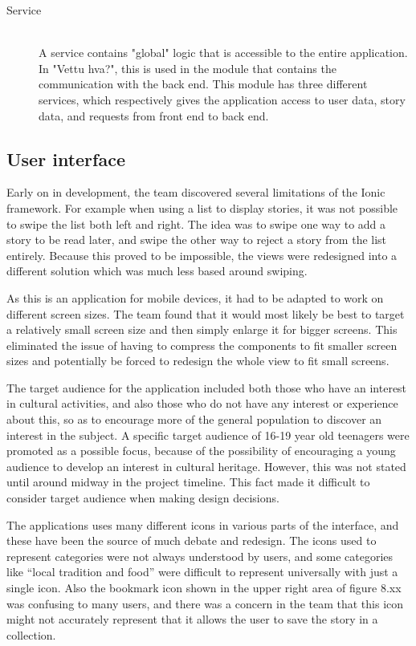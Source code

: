 \begin{description}
	\item[Service] \hfill \\ 
	A service contains "global" logic that is accessible to the entire application. In "Vettu hva?", this is used in the module that contains the communication with the back end. This module has three different services, which respectively gives the application access to user data, story data, and requests from front end to back end.
\end{description}

\subsection{User interface}

Early on in development, the team discovered several limitations of the Ionic framework. For example when using a list to display stories, it was not possible to swipe the list both left and right. The idea was to swipe one way to add a story to be read later, and swipe the other way to reject a story from the list entirely.  Because this proved to be impossible, the views were redesigned into a different solution which was much less based around swiping.\newline

As this is an application for mobile devices, it had to be adapted to work on different screen sizes. The team found that it would most likely be best to target a relatively small screen size and then simply enlarge it for bigger screens. This eliminated the issue of having to compress the components to fit smaller screen sizes and potentially be forced to redesign the whole view to fit small screens.\newline

The target audience for the application included both those who have an interest in cultural activities, and also those who do not have any interest or experience about this, so as to encourage more of the general population to discover an interest in the subject. A specific target audience of 16-19 year old teenagers were promoted as a possible focus, because of the possibility of encouraging a young audience to develop an interest in cultural heritage. However, this was not stated until around  midway in the project timeline. This fact made it difficult to consider target audience when making design decisions. \newline

The applications uses many different icons in various parts of the interface, and these have been the source of much debate and redesign. The icons used to represent categories were not always understood by users, and some categories like “local tradition and food” were difficult to represent universally with just a single icon. Also the bookmark icon shown in the upper right area of figure 8.xx was confusing to many users, and there was a concern in the team that this icon might not accurately represent that it allows the user to save the story in a collection.\newline

